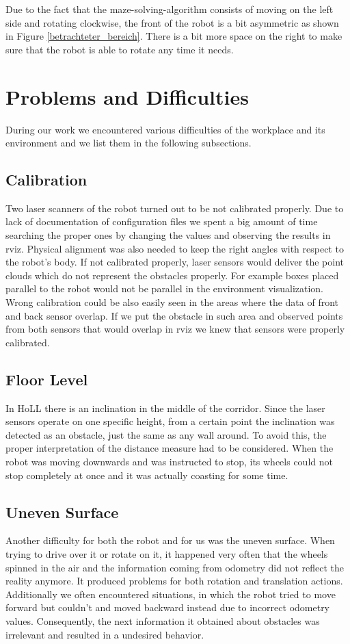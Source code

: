 Due to the fact that the maze-solving-algorithm consists of moving on the left side and rotating clockwise, the front of the robot is a bit asymmetric as shown in Figure \ref{betrachteter_bereich}. There is a bit more space on the right to make sure that the robot is able to rotate any time it needs.




\section{Problems and Difficulties} \label{problems}
During our work we encountered various difficulties of the workplace and its environment and we list them in the following subsections.

\subsection{Calibration}
Two laser scanners of the robot turned out to be not calibrated properly. Due to lack of documentation of configuration files we spent a big amount of time searching the proper ones by changing the values and observing the results in rviz. Physical alignment was also needed to keep the right angles with respect to the robot's body. If not calibrated properly, laser sensors would deliver the point clouds which do not represent the obstacles properly. For example boxes placed parallel to the robot would not be parallel in the environment visualization. Wrong calibration could be also easily seen in the areas where the data of front and back sensor overlap. If we put the obstacle in such area and observed points from both sensors that would overlap in rviz we knew that sensors were properly calibrated.

\subsection{Floor Level}
In HoLL there is an inclination in the middle of the corridor. Since the laser sensors operate on one specific height, from a certain point the inclination was detected as an obstacle, just the same as any wall around. To avoid this, the proper interpretation of the distance measure had to be considered.
When the robot was moving downwards and was instructed to stop, its wheels could not stop completely at once and it was actually coasting for some time.

\subsection{Uneven Surface}
Another difficulty for both the robot and for us was the uneven surface. When trying to drive over it or rotate on it, it happened very often that the wheels spinned in the air and the information coming from odometry did not reflect the reality anymore. It produced problems for both rotation and translation actions. Additionally we often encountered situations, in which the robot tried to move forward but couldn't and moved backward  instead due to incorrect odometry values. Consequently, the next information it obtained about obstacles was irrelevant and resulted in a undesired behavior.

